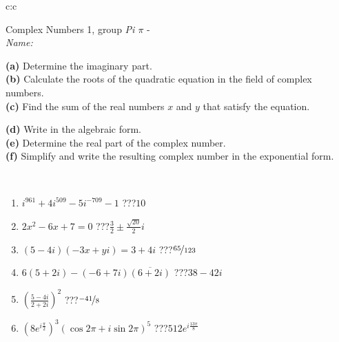 \documentclass[10pt]{report}
\begin{document}
\begin{tabular}{c:c}
\begin{minipage}[c][104.5mm][t]{0.5\linewidth}
\begin{center}
{\huge Complex Numbers 1, group \textit{Pi $\pi$} -}\\[5mm]
\textit{Name:}\phantom{xxxxxxxxxxxxxxxxxxxxxxxxxxxxxxxxxxxxxxxxxxxxxxxxxxxxxxxxxxxxxxxxx}\\[5mm]
\begin{minipage}{0.95\linewidth}
\begin{center}
{\small \begin{minipage}{0.44\textwidth} \raggedright
\textbf{(a)} Determine the imaginary part. \\[1mm]
\textbf{(b)} Calculate the roots of the quadratic equation in the field of complex numbers. \\[1mm]
\textbf{(c)} Find the sum of the real numbers \(x\) and \(y\) that satisfy the equation. \end{minipage} \begin{minipage}{0.54\textwidth}
\textbf{(d)} Write in the algebraic form. \\[1mm]
\textbf{(e)} Determine the real part of the complex number. \\[1mm]
\textbf{(f)} Simplify and write the resulting complex number in the exponential form.
\end{minipage}
} \vspace{3mm}
\end{center}
\end{minipage}
\\[1mm]
\begin{minipage}{0.79\linewidth}
\begin{center}
\begin{varwidth}{\linewidth}
\setlength{\itemsep}{0pt}
\begin{enumerate}
\large
\item $i^{961}+4i^{509}-5i^{-709}-1$\quad \dotfill\; ???\;\dotfill \quad $10$
\item $2x^2-6x+7=0$\quad \dotfill\; ???\;\dotfill \quad $\frac{3}{2} \pm{}\frac{ \sqrt{20}}{2}i$
\item $(5-4i)(-3x+yi)=3+4i$\quad \dotfill\; ???\;\dotfill \quad $\nicefrac{65}{123}$
\item $6(5+2i)-(-6+7i)\overline{(6+2i)}$\quad \dotfill\; ???\;\dotfill \quad $38-42i$
\item $\left(\frac{5-4i}{2+2i}\right)^2$\quad \dotfill\; ???\;\dotfill \quad $\nicefrac{-41}{8}$
\item $\left(8e^{i\frac{\pi}{2}}\right)^{3}\left(\cos{2\pi}+i\sin{2\pi}\right)^{5}$\quad \dotfill\; ???\;\dotfill \quad $512e^{i\frac{13\pi}{8}}$
\end{enumerate}

\end{varwidth}
\end{center}
\end{minipage}
\end{center}
\end{minipage}
\end{tabular}
\end{document}
